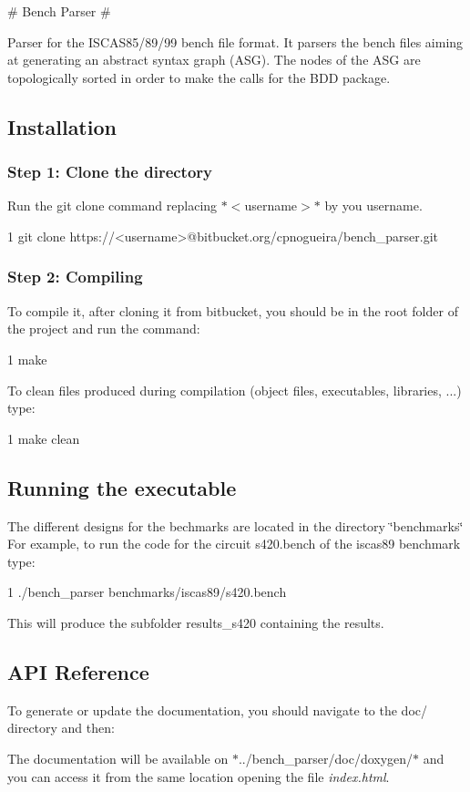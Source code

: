 \# Bench Parser \#

Parser for the I\+S\+C\+A\+S85/89/99 bench file format. It parsers the bench files aiming at generating an abstract syntax graph (A\+SG). The nodes of the A\+SG are topologically sorted in order to make the calls for the B\+DD package.

\subsection*{Installation}

\subsubsection*{Step 1\+: Clone the directory}

Run the git clone command replacing $\ast$$<$username$>$$\ast$ by you username. 
\begin{DoxyCode}
1 git clone https://<username>@bitbucket.org/cpnogueira/bench\_parser.git
\end{DoxyCode}


\subsubsection*{Step 2\+: Compiling}

To compile it, after cloning it from bitbucket, you should be in the root folder of the project and run the command\+: 
\begin{DoxyCode}
1 make
\end{DoxyCode}


To clean files produced during compilation (object files, executables, libraries, ...) type\+: 
\begin{DoxyCode}
1 make clean
\end{DoxyCode}


\subsection*{Running the executable}

The different designs for the bechmarks are located in the directory \char`\"{}benchmarks\char`\"{} For example, to run the code for the circuit s420.\+bench of the iscas89 benchmark type\+: 
\begin{DoxyCode}
1 ./bench\_parser benchmarks/iscas89/s420.bench
\end{DoxyCode}


This will produce the subfolder results\+\_\+s420 containing the results.

\subsection*{A\+PI Reference}

To generate or update the documentation, you should navigate to the doc/ directory and then\+: 
 The documentation will be available on $\ast$../bench\+\_\+parser/doc/doxygen/$\ast$ and you can access it from the same location opening the file {\itshape index.\+html}. 